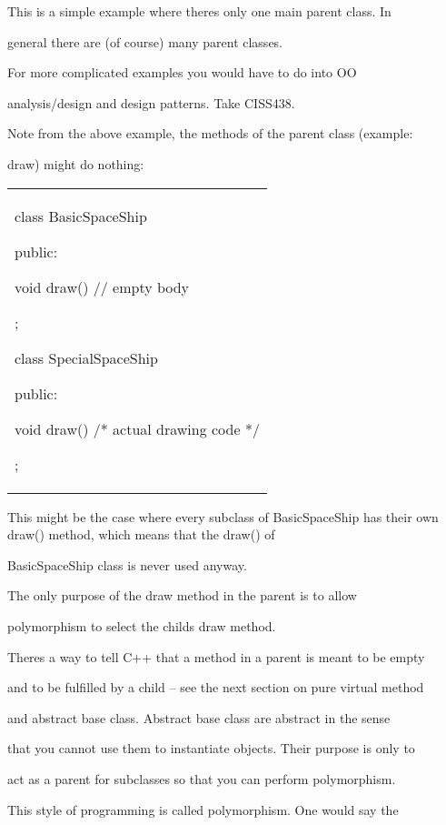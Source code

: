This is a simple example where there\textquotesingle s only one main
parent class. In

general there are (of course) many parent classes.

For more complicated examples you would have to do into OO

analysis/design and design patterns. Take CISS438.

Note from the above example, the methods of the parent class (example:

draw) might do nothing:

\begin{longtable}[]{@{}
  >{\raggedright\arraybackslash}p{}@{}}
\toprule\noalign{}
 \\
\midrule\noalign{}
\endhead
\bottomrule\noalign{}
\endlastfoot
class BasicSpaceShip

{

public:

void draw() {} // empty body

};

class SpecialSpaceShip

{

public:

void draw() { /* actual drawing code */ }

}; \\
\end{longtable}

This might be the case where every subclass of BasicSpaceShip has their
own draw() method, which means that the draw() of

BasicSpaceShip class is never used anyway.

The only purpose of the draw method in the parent is to allow

polymorphism to select the child\textquotesingle s draw method.

There\textquotesingle s a way to tell C++ that a method in a parent is
meant to be empty

and to be fulfilled by a child -- see the next section on pure virtual
method

and abstract base class. Abstract base class are abstract in the sense

that you cannot use them to instantiate objects. Their purpose is only
to

act as a parent for subclasses so that you can perform polymorphism.

This style of programming is called polymorphism. One would say the

